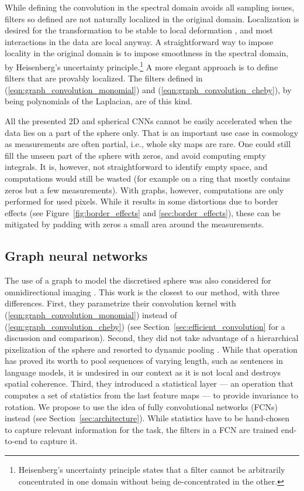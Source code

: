 \documentclass[final,twocolumn,3p,times,sort&compress]{elsarticle}
\newcommand{\figref}[1]{Figure~\ref{fig:#1}}
\newcommand{\secref}[1]{Section~\ref{sec:#1}}
\newcommand{\eqnref}[1]{(\ref{eqn:#1})}
\newcommand{\1}{\b{1}}              %
\newcommand{\0}{\b{0}}              %
\begin{document}
While defining the convolution in the spectral domain avoids all sampling issues, filters so defined are not naturally localized in the original domain.
Localization is desired for the transformation to be stable to local deformation \citep{mallat2012scattering}, and most interactions in the data are local anyway.
A straightforward way to impose locality in the original domain is to impose smoothness in the spectral domain, by Heisenberg's uncertainty principle.\footnote{Heisenberg's uncertainty principle states that a filter cannot be arbitrarily concentrated in one domain without being de-concentrated in the other.}
A more elegant approach is to define filters that are provably localized.
The filters defined in \eqnref{graph_convolution_monomial} and \eqnref{graph_convolution_cheby}, by being polynomials of the Laplacian, are of this kind.

All the presented 2D and spherical CNNs cannot be easily accelerated when the data lies on a part of the sphere only.
That is an important use case in cosmology as measurements are often partial, i.e., whole sky maps are rare.
One could still fill the unseen part of the sphere with zeros, and avoid computing empty integrals.
It is, however, not straightforward to identify empty space, and computations would still be wasted (for example on a ring that mostly contains zeros but a few measurements).
With graphs, however, computations are only performed for used pixels.
While it results in some distortions due to border effects (see \figref{border_effects} and \ref{sec:border_effects}), these can be mitigated by padding with zeros a small area around the measurements.

\subsection{Graph neural networks}

The use of a graph to model the discretised sphere was also considered for omnidirectional imaging \citep{khasanova2017graphomni}.
This work is the closest to our method, with three differences. First, they parametrize their convolution kernel with \eqnref{graph_convolution_monomial} instead of \eqnref{graph_convolution_cheby} (see \secref{efficient_convolution} for a discussion and comparison).
Second, they did not take advantage of a hierarchical pixelization of the sphere and resorted to dynamic pooling \citep{kalchbrenner2014dcnn}.
While that operation has proved its worth to pool sequences of varying length, such as sentences in language models, it is undesired in our context as it is not local and destroys spatial coherence.
Third, they introduced a statistical layer --- an operation that computes a set of statistics from the last feature maps --- to provide invariance to rotation.
We propose to use the idea of fully convolutional networks (FCNs) instead (see \secref{architecture}).
While statistics have to be hand-chosen to capture relevant information for the task, the filters in a FCN are trained end-to-end to capture it.
\end{document}
